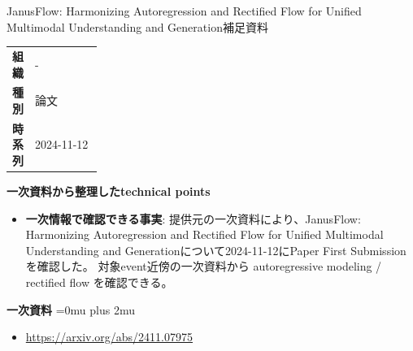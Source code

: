 \begin{technicalnote}{JanusFlow: Harmonizing Autoregression and Rectified Flow for Unified Multimodal Understanding and Generation}{補足資料}
\begingroup
\begin{tabularx}{\linewidth}{@{}>{\bfseries}p{0.22\linewidth}X@{}}
組織 & - \\
種別 & 論文 \\
時系列 & 2024-11-12 \\
\end{tabularx}
\smallskip
{\bfseries 一次資料から整理したtechnical points}
\begin{itemize}[leftmargin=1.5em,itemsep=0.35em]
\item \textbf{一次情報で確認できる事実}: 提供元の一次資料により、JanusFlow: Harmonizing Autoregression and Rectified Flow for Unified Multimodal Understanding and Generationについて2024-11-12にPaper First Submissionを確認した。 対象event近傍の一次資料から autoregressive modeling / rectified flow を確認できる。
\end{itemize}
\begin{minipage}{\linewidth}
\begin{samepage}
{\bfseries 一次資料}
\begingroup\sloppy
\Urlmuskip=0mu plus 2mu\relax
\begin{itemize}[leftmargin=1.5em,itemsep=0.25em]
\item {\scriptsize\url{https://arxiv.org/abs/2411.07975}}
\end{itemize}
\endgroup
\end{samepage}
\end{minipage}
\endgroup
\end{technicalnote}
\medskip

